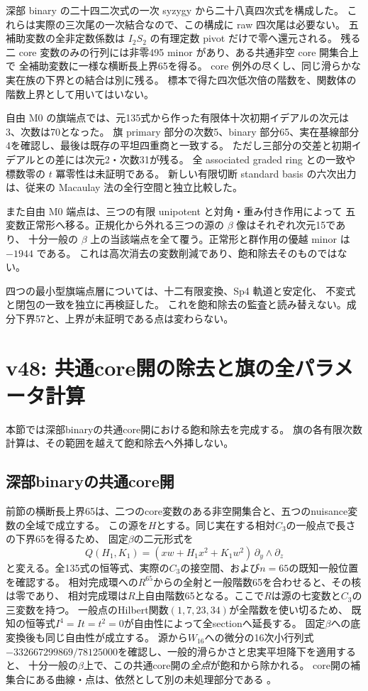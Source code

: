 \documentclass[11pt,a4paper]{ltjsarticle}
\theoremstyle{remark}
\begin{document}
深部 binary の二十四二次式の一次 syzygy から二十八真四次式を構成した。
これらは実際の三次尾の一次結合なので、この構成に raw 四次尾は必要ない。
五補助変数の全非定数係数は $I_2S_2$ の有理定数 pivot だけで零へ還元される。
残る二 core 変数のみの行列には非零495 minor があり、ある共通非空 core 開集合上で
全補助変数に一様な横断長上界65を得る。\cite{deep-four-v47}
core 例外の尽くし、同じ滑らかな実在族の下界との結合は別に残る。
標本で得た四次低次倍の階数を、関数体の階数上界として用いてはいない。

自由 M0 の旗端点では、元135式から作った有限体十次初期イデアルの次元は3、次数は70となった。
旗 primary 部分の次数5、binary 部分65、実在基線部分4を確認し、最後は既存の平坦四重商と一致する。
ただし三部分の交差と初期イデアルとの差には次元2・次数31が残る。
全 associated graded ring との一致や標数零の $t$ 冪零性は未証明である。
新しい有限切断 standard basis の六次出力は、従来の Macaulay 法の全行空間と独立比較した。
\cite{free-initial-v47}

また自由 M0 端点は、三つの有限 unipotent と対角・重み付き作用によって
五変数正常形へ移る。正規化から外れる三つの源の $\beta$ 像はそれぞれ次元15であり、
十分一般の $\beta$ 上の当該端点を全て覆う。正常形と群作用の優越 minor は $-1944$ である。
これは高次消去の変数削減であり、飽和除去そのものではない。\cite{free-normal-v47}

四つの最小型旗端点層については、十二有限変換、Sp4 軌道と安定化、
不変式と閉包の一致を独立に再検証した。\cite{flag-table-review-v47}
これを飽和除去の監査と読み替えない。成分下界57と、上界が未証明である点は変わらない。



\section{v48: 共通core開の除去と旗の全パラメータ計算}
\label{sec:v48}
本節では深部binaryの共通core開における飽和除去を完成する。
旗の各有限次数計算は、その範囲を越えて飽和除去へ外挿しない。

\subsection{深部binaryの共通core開}
前節の横断長上界65は、二つのcore変数のある非空開集合と、五つのnuisance変数の全域で成立する。
この源を$H$とする。同じ実在する相対$C_3$の一般点で長さの下界65を得るため、
固定$\beta$の二元形式を
\[
 Q(H_1,K_1)=(xw+H_1x^2+K_1w^2)\,\partial_y\wedge\partial_z
\]
と変える。全135式の恒等式、実際の$C_3$の接空間、および$n=65$の既知一般位置を確認する。
相対完成環への$R^{65}$からの全射と一般階数65を合わせると、その核は零であり、
相対完成環は$R$上自由階数65となる。ここで$R$は源の七変数と$C_3$の三変数を持つ。
一般点のHilbert関数$(1,7,23,34)$が全階数を使い切るため、
既知の恒等式$I^4=It=t^2=0$が自由性によって全sectionへ延長する。
固定$\beta$への底変換後も同じ自由性が成立する。
源から$W_{16}$への微分の16次小行列式
$-332667299869/78125000$を確認し、一般的滑らかさと忠実平坦降下を適用すると、
十分一般の$\beta$上で、この共通core開の\emph{全点}が飽和から除かれる。
core開の補集合にある曲線・点は、依然として別の未処理部分である
\cite{deep-core-v48}。
\end{document}
